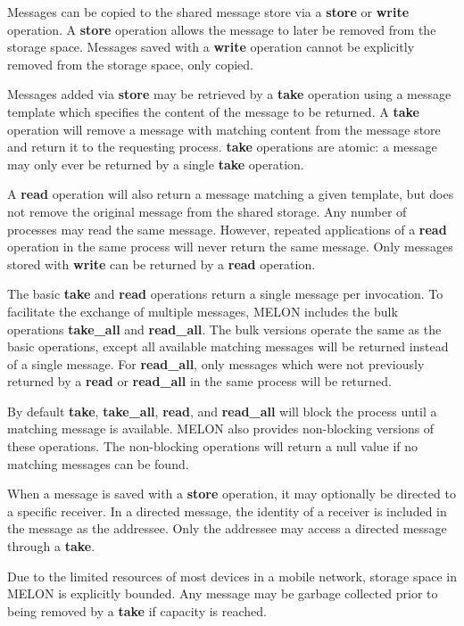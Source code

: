 Messages can be copied to the shared message store via a \textbf{store} or \textbf{write} operation. A \textbf{store} operation allows the message to later be removed from the storage space. Messages saved with a \textbf{write} operation cannot be explicitly removed from the storage space, only copied.

Messages added via \textbf{store} may be retrieved by a \textbf{take} operation using a message template which specifies the content of the message to be returned. A \textbf{take} operation will remove a message with matching content from the message store and return it to the requesting process. \textbf{take} operations are atomic: a message may only ever be returned by a single \textbf{take} operation.

A \textbf{read} operation will also return a message matching a given template, but does not remove the original message from the shared storage. Any number of processes may read the same message. However, repeated applications of a \textbf{read} operation in the same process will never return the same message. Only messages stored with \textbf{write} can be returned by a \textbf{read} operation.

The basic \textbf{take} and \textbf{read} operations return a single message per invocation. To facilitate the exchange of multiple messages, MELON includes the bulk operations \textbf{take\_all} and \textbf{read\_all}. The bulk versions operate the same as the basic operations, except all available matching messages will be returned instead of a single message. For \textbf{read\_all}, only messages which were not previously returned by a \textbf{read} or \textbf{read\_all} in the same process will be returned.

By default \textbf{take}, \textbf{take\_all}, \textbf{read}, and \textbf{read\_all} will block the process until a matching message is available. MELON also provides non-blocking versions of these operations. The non-blocking operations will return a null value if no matching messages can be found.

When a message is saved with a \textbf{store} operation, it may optionally be directed to a specific receiver. In a directed message, the identity of a receiver is included in the message as the addressee. Only the addressee may access a directed message through a \textbf{take}.

Due to the limited resources of most devices in a mobile network, storage space in MELON is explicitly bounded. Any message may be garbage collected prior to being removed by a \textbf{take} if capacity is reached.

